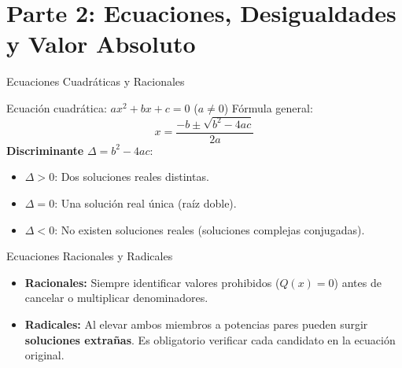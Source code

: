 \documentclass[aspectratio=169]{beamer}
\begin{document}
\section{Parte 2: Ecuaciones, Desigualdades y Valor Absoluto}


\begin{frame}{Ecuaciones Cuadráticas y Racionales}
  \begin{block}{Ecuación cuadrática: $ax^2 + bx + c = 0$ ($a \neq 0$)}
    Fórmula general:
    $$x = \frac{-b \pm \sqrt{b^2 - 4ac}}{2a}$$
    \textbf{Discriminante} $\Delta = b^2 - 4ac$:
    \begin{itemize}
      \item $\Delta > 0$: Dos soluciones reales distintas.
      \item $\Delta = 0$: Una solución real única (raíz doble).
      \item $\Delta < 0$: No existen soluciones reales (soluciones complejas conjugadas).
    \end{itemize}
  \end{block}

  \vspace{4pt}
  \begin{alertblock}{Ecuaciones Racionales y Radicales}
    \begin{itemize}
      \item \textbf{Racionales:} Siempre identificar valores prohibidos ($Q(x) = 0$) antes de cancelar o multiplicar denominadores.
      \item \textbf{Radicales:} Al elevar ambos miembros a potencias pares pueden surgir \textbf{soluciones extrañas}. Es obligatorio verificar cada candidato en la ecuación original.
    \end{itemize}
  \end{alertblock}
\end{frame}
\end{document}
